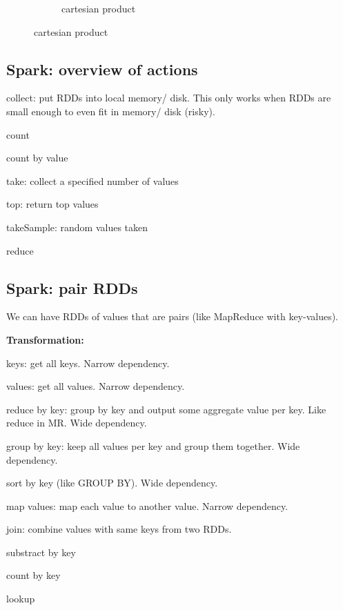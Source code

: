 \documentclass[11pt,oneside,a4paper]{article}
\begin{document}
\begin{figure}[hb!]
\begin{subfigure}[t]{.21\textwidth}
	\caption{cartesian product}
	\end{subfigure}
\end{figure}


\subsection{Spark: overview of actions}

\begin{compactitem}
\item collect: put RDDs into local memory/ disk. This only works when RDDs are small enough to even fit in memory/ disk (risky).
\item count
\item count by value
\item take: collect a specified number of values
\item top: return top values
\item takeSample: random values taken
\item reduce
\end{compactitem}

\subsection{Spark: pair RDDs}

We can have RDDs of values that are pairs (like MapReduce with key-values).

\textbf{Transformation:}

\begin{compactitem}
\item keys: get all keys. Narrow dependency.
\item values: get all values. Narrow dependency.
\item reduce by key: group by key and output some aggregate value per key. Like reduce in MR. Wide dependency.
\item group by key: keep all values per key and group them together. Wide dependency.
\item sort by key (like GROUP BY). Wide dependency.
\item map values: map each value to another value. Narrow dependency.
\item join: combine values with same keys from two RDDs.
\item substract by key
\item count by key
\item lookup
\end{compactitem}
\end{document}
